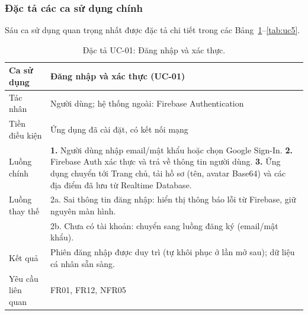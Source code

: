 \subsubsection{Đặc tả các ca sử dụng chính}
Sáu ca sử dụng quan trọng nhất được đặc tả chi tiết trong các Bảng~\ref{tab:uc1}--\ref{tab:uc5}.

\begin{table}[h!]
\centering
\caption{Đặc tả UC-01: Đăng nhập và xác thực.}
\label{tab:uc1}
\small
\begin{tabularx}{\textwidth}{lX}
\toprule
\textbf{Ca sử dụng} & Đăng nhập và xác thực (UC-01)\\
\midrule
Tác nhân & Người dùng; hệ thống ngoài: Firebase Authentication\\
Tiền điều kiện & Ứng dụng đã cài đặt, có kết nối mạng\\
Luồng chính & \textbf{1.} Người dùng nhập email/mật khẩu hoặc chọn Google Sign-In. \textbf{2.} Firebase Auth xác thực và trả về thông tin người dùng. \textbf{3.} Ứng dụng chuyển tới Trang chủ, tải hồ sơ (tên, avatar Base64) và các địa điểm đã lưu từ Realtime Database.\\
Luồng thay thế & 2a. Sai thông tin đăng nhập: hiển thị thông báo lỗi từ Firebase, giữ nguyên màn hình.\\
 & 2b. Chưa có tài khoản: chuyển sang luồng đăng ký (email/mật khẩu).\\
Kết quả & Phiên đăng nhập được duy trì (tự khôi phục ở lần mở sau); dữ liệu cá nhân sẵn sàng.\\
Yêu cầu liên quan & FR01, FR12, NFR05\\
\bottomrule
\end{tabularx}
\end{table}

